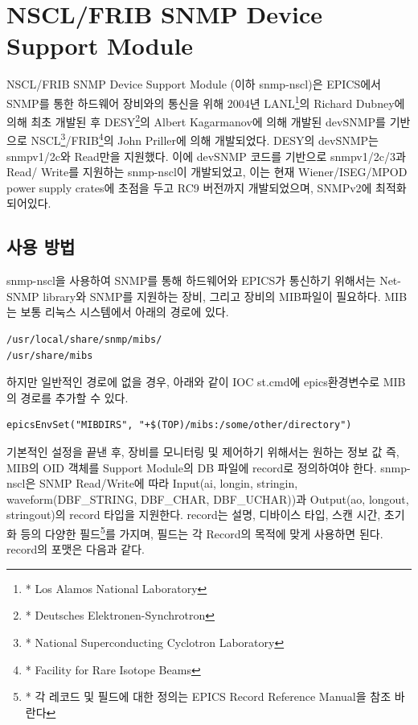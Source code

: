 \documentclass[11pt
  , a4paper
  , article
  , oneside
]{memoir}
\begin{document}
\section{NSCL/FRIB SNMP Device Support Module}
NSCL/FRIB SNMP Device Support Module (이하 snmp-nscl)은 EPICS에서 SNMP를 통한 하드웨어 장비와의 통신을 위해 2004년 LANL\footnote{* Los Alamos National Laboratory}의 Richard Dubney에 의해 최초 개발된 후 DESY\footnote{* Deutsches Elektronen-Synchrotron}의 Albert Kagarmanov에 의해 개발된 devSNMP를 기반으로 NSCL\footnote{* National Superconducting Cyclotron Laboratory}/FRIB\footnote{* Facility for Rare Isotope Beams}의 John Priller에 의해 개발되었다. DESY의 devSNMP는 snmpv1/2c와 Read만을 지원했다. 이에 devSNMP 코드를 기반으로 snmpv1/2c/3과 Read/ Write를 지원하는 snmp-nscl이 개발되었고, 이는 현재 Wiener/ISEG/MPOD power supply crates에 초점을 두고 RC9 버전까지 개발되었으며, SNMPv2에 최적화 되어있다\citep{devsnmp}. 

\subsection{사용 방법}
snmp-nscl을 사용하여 SNMP를 통해 하드웨어와 EPICS가 통신하기 위해서는 Net-SNMP library와 SNMP를 지원하는 장비, 그리고 장비의 MIB파일이 필요하다. MIB는 보통 리눅스 시스템에서 아래의 경로에 있다.

\begin{lstlisting}[style=termstyle]
/usr/local/share/snmp/mibs/ 
/usr/share/mibs
\end{lstlisting}

하지만 일반적인 경로에 없을 경우, 아래와 같이 IOC st.cmd에 epics환경변수로 MIB의 경로를 추가할 수 있다.

\begin{lstlisting}[style=termstyle]
epicsEnvSet("MIBDIRS", "+$(TOP)/mibs:/some/other/directory")
\end{lstlisting}

기본적인 설정을 끝낸 후, 장비를 모니터링 및 제어하기 위해서는 원하는 정보 값 즉, MIB의 OID 객체를 Support Module의 DB 파일에 record로 정의하여야 한다. snmp-nscl은 SNMP Read/Write에 따라 Input(ai, longin, stringin, waveform(DBF\_STRING, DBF\_CHAR, DBF\_UCHAR))과 Output(ao, longout, stringout)의 record 타입을 지원한다. record는 설명, 디바이스 타입, 스캔 시간, 초기화 등의 다양한 필드\footnote{* 각 레코드 및 필드에 대한 정의는 EPICS Record Reference Manual\citep{record}을 참조 바란다}를 가지며, 필드는 각 Record의 목적에 맞게 사용하면 된다. record의 포맷은 다음과 같다. 

\clearpage
\end{document}
